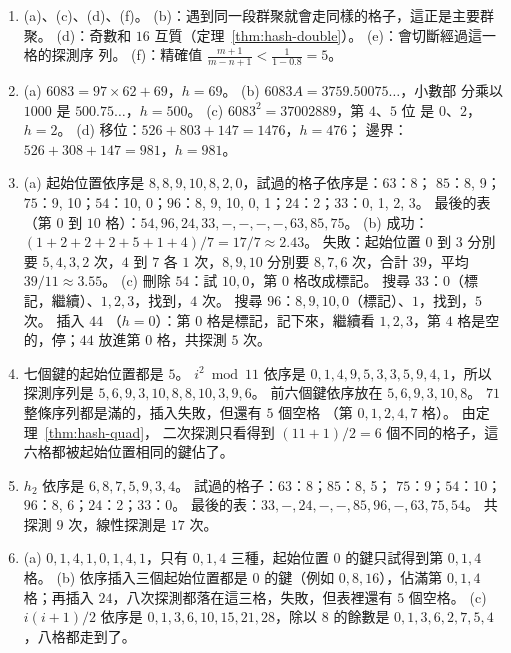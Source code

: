 \begin{enumerate}[itemsep=0.15em]
\item (a)、(c)、(d)、(f)。 (b)：遇到同一段群聚就會走同樣的格子，這正是主要群聚。
(d)：奇數和 $16$ 互質（定理~\ref{thm:hash-double}）。 (e)：會切斷經過這一格的探測序
列。 (f)：精確值 $\frac{m+1}{m-n+1} < \frac{1}{1-0.8} = 5$。

\item (a) $6083 = 97 \times 62 + 69$，$h = 69$。 (b) $6083A = 3759.50075\ldots$，小數部
分乘以 $1000$ 是 $500.75\ldots$，$h = 500$。 (c) $6083^2 = 37002889$，第 $4$、$5$ 位
是 $0$、$2$，$h = 2$。 (d) 移位：$526 + 803 + 147 = 1476$，$h = 476$；
邊界：$526 + 308 + 147 = 981$，$h = 981$。

\item (a) 起始位置依序是 $8, 8, 9, 10, 8, 2, 0$，試過的格子依序是：$63$：8；
$85$：8, 9；$75$：9, 10；$54$：10, 0；$96$：8, 9, 10, 0, 1；$24$：2；$33$：0, 1, 2, 3。
最後的表（第 $0$ 到 $10$ 格）：$54, 96, 24, 33, -, -, -, -, 63, 85, 75$。 (b) 成功：$(1+2+2+2+5+1+4)/7 = 17/7 \approx 2.43$。 失敗：起始位置 $0$ 到 $3$ 分別要
$5, 4, 3, 2$ 次，$4$ 到 $7$ 各 $1$ 次，$8, 9, 10$ 分別要 $8, 7, 6$ 次，合計 $39$，平均
$39/11 \approx 3.55$。 (c) 刪除 $54$：試 $10, 0$，第 $0$ 格改成標記。 搜尋 $33$：$0$（標記，繼續）、$1, 2,
3$，找到，$4$ 次。 搜尋 $96$：$8, 9, 10, 0$（標記）、$1$，找到，$5$ 次。 插入 $44$
（$h = 0$）：第 $0$ 格是標記，記下來，繼續看 $1, 2, 3$，第 $4$ 格是空的，停；$44$
放進第 $0$ 格，共探測 $5$ 次。

\item 七個鍵的起始位置都是 $5$。 $i^2 \bmod 11$ 依序是 $0, 1, 4, 9, 5, 3, 3, 5, 9, 4,
1$，所以探測序列是 $5, 6, 9, 3, 10, 8, 8, 10, 3, 9, 6$。 前六個鍵依序放在
$5, 6, 9, 3, 10, 8$。 $71$ 整條序列都是滿的，插入失敗，但還有 $5$ 個空格
（第 $0, 1, 2, 4, 7$ 格）。 由定理~\ref{thm:hash-quad}，
二次探測只看得到 $(11+1)/2 = 6$ 個不同的格子，這六格都被起始位置相同的鍵佔了。

\item $h_2$ 依序是 $6, 8, 7, 5, 9, 3, 4$。 試過的格子：$63$：8；$85$：8, 5；
$75$：9；$54$：10；$96$：8, 6；$24$：2；$33$：0。
最後的表：$33, -, 24, -, -, 85, 96, -, 63, 75, 54$。 共探測 $9$ 次，線性探測是 $17$ 次。

\item (a) $0, 1, 4, 1, 0, 1, 4, 1$，只有 $0, 1, 4$ 三種，起始位置 $0$ 的鍵只試得到第
$0, 1, 4$ 格。 (b) 依序插入三個起始位置都是 $0$ 的鍵（例如 $0, 8, 16$），佔滿第 $0,
1, 4$ 格；再插入 $24$，八次探測都落在這三格，失敗，但表裡還有 $5$ 個空格。 (c)
$i(i+1)/2$ 依序是 $0, 1, 3, 6, 10, 15, 21, 28$，除以 $8$ 的餘數是
$0, 1, 3, 6, 2, 7, 5, 4$，八格都走到了。


\end{enumerate}
